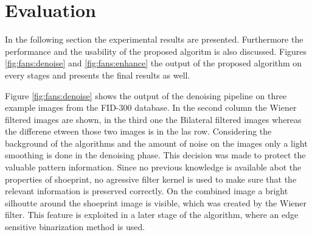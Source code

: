 \documentclass[draft,final]{vutinfth} %
\begin{document}
\section{Evaluation}
\par
In the following section the experimental results are presented.
Furthermore the performance and the usability of the proposed algoritm is also discussed.
Figures \ref{fig:fans:denoise} and \ref{fig:fans:enhance} the output of the proposed algorithm on every stages and presents the final results as well.
\par
Figure \ref{fig:fans:denoise} shows the output of the denoising pipeline on three example images from the FID-300 database.
In the second column the Wiener filtered images are shown, in the third one the Bilateral filtered images whereas the differene etween those two images is in the las row.
Considering the background of the algorithms and the amount of noise on the images only a light smoothing is done in the denoising phase.
This decision was made to protect the valuable pattern information.
Since no previous knowledge is available abot the properties of shoeprint, no agressive filter kernel is used to make sure that the relevant information is preserved correctly.
On the combined image a bright silhoutte around the shoeprint image is visible, which was created by the Wiener filter.
This feature is exploited in a later stage of the algorithm, where an edge sensitive binarization method is used.
\end{document}
